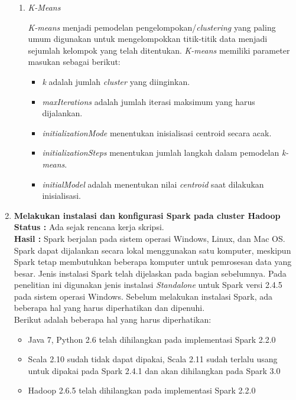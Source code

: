 \documentclass[a4paper,twoside]{article}
\begin{document}
\begin{enumerate}
\begin{enumerate}
\item \textit{K-Means}

\textit{K-means} menjadi pemodelan pengelompokan/\textit{clustering} yang paling umum digunakan untuk mengelompokkan titik-titik data menjadi sejumlah kelompok yang telah ditentukan. \textit{K-means} memiliki parameter masukan sebagai berikut:

\begin{itemize}
\item \textit{k} adalah jumlah \textit{cluster} yang diinginkan. 
\item \textit{maxIterations} adalah jumlah iterasi maksimum yang harus dijalankan.
\item \textit{initializationMode} menentukan inisialisasi centroid secara acak.
\item \textit{initializationSteps} menentukan jumlah langkah dalam pemodelan \textit{k-means}.
\item \textit{initialModel} adalah menentukan nilai \textit{centroid} saat dilakukan inisialisasi.
\end{itemize}

\end{enumerate}

\item \textbf{Melakukan instalasi dan konfigurasi Spark pada cluster Hadoop}\\
		{\bf Status :} Ada sejak rencana kerja skripsi.\\
		{\bf Hasil :} Spark berjalan pada sistem operasi Windows, Linux, dan Mac OS. Spark dapat dijalankan secara lokal menggunakan satu komputer, meskipun Spark tetap membutuhkan beberapa komputer untuk pemrosesan data yang besar. Jenis instalasi Spark telah dijelaskan pada bagian sebelumnya. Pada penelitian ini digunakan jenis instalasi \textit{Standalone} untuk Spark versi 2.4.5 pada sistem operasi Windows. Sebelum melakukan instalasi Spark, ada beberapa hal yang harus diperhatikan dan dipenuhi. \\

\noindent Berikut adalah beberapa hal yang harus diperhatikan:

\begin{itemize}
\item Java 7, Python 2.6 telah dihilangkan pada implementasi Spark 2.2.0
\item Scala 2.10 sudah tidak dapat dipakai, Scala 2.11 sudah terlalu usang untuk dipakai pada Spark 2.4.1 dan akan dihilangkan pada Spark 3.0
\item Hadoop 2.6.5 telah dihilangkan pada implementasi Spark 2.2.0 
\end{itemize}


\end{enumerate}
\end{document}
